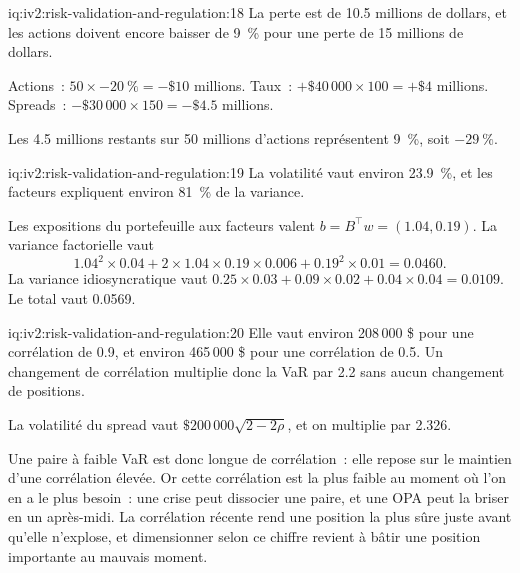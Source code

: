 \begin{solution}{iq:iv2:risk-validation-and-regulation:18}
La perte est de 10.5 millions de dollars, et les actions doivent encore baisser de 9~\% pour une perte de 15 millions de dollars.

Actions~: $50 \times -20~\% = -\$10$ millions. Taux~: $+\$40\,000 \times 100 = +\$4$ millions. Spreads~: $-\$30\,000 \times 150 = -\$4.5$ millions.

Les 4.5 millions restants sur 50 millions d'actions représentent 9~\%, soit $-29~\%$.

\end{solution}

\begin{solution}{iq:iv2:risk-validation-and-regulation:19}
La volatilité vaut environ 23.9~\%, et les facteurs expliquent environ 81~\% de la variance.

Les expositions du portefeuille aux facteurs valent $b = B^\top w = (1.04, 0.19)$. La variance factorielle vaut
\[
1.04^2 \times 0.04 + 2 \times 1.04 \times 0.19 \times 0.006 + 0.19^2 \times 0.01 = 0.0460.
\]
La variance idiosyncratique vaut $0.25 \times 0.03 + 0.09 \times 0.02 + 0.04 \times 0.04 = 0.0109$. Le total vaut 0.0569.

\end{solution}

\begin{solution}{iq:iv2:risk-validation-and-regulation:20}
Elle vaut environ 208\,000 \$ pour une corrélation de 0.9, et environ 465\,000 \$ pour une corrélation de 0.5. Un changement de corrélation multiplie donc la VaR par 2.2 sans aucun changement de positions.

La volatilité du spread vaut $\$200\,000\sqrt{2 - 2\rho}$, et on multiplie par 2.326.

Une paire à faible VaR est donc longue de corrélation~: elle repose sur le maintien d'une corrélation élevée. Or cette corrélation est la plus faible au moment où l'on en a le plus besoin~: une crise peut dissocier une paire, et une OPA peut la briser en un après-midi. La corrélation récente rend une position la plus sûre juste avant qu'elle n'explose, et dimensionner selon ce chiffre revient à bâtir une position importante au mauvais moment.

\end{solution}


